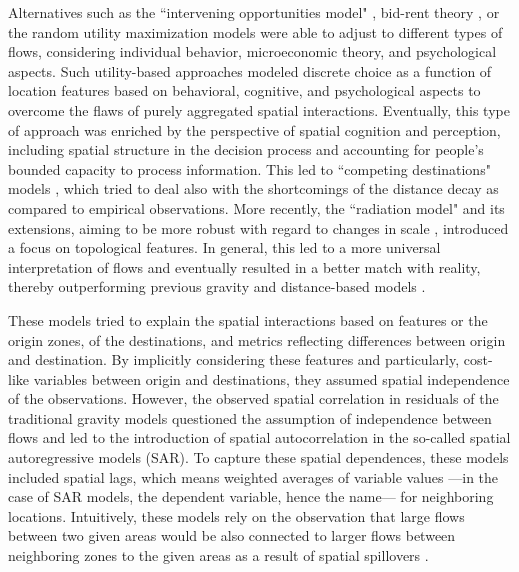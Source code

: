 Alternatives such as the ``intervening opportunities model" \citep{Stouffer1940InterveningDistance}, bid-rent theory \citep{Alonso1964LocationRent}, or the random utility maximization models \citep{Block1959RandomResponse} were able to adjust to different types of flows, considering individual behavior, microeconomic theory, and psychological aspects. Such utility-based approaches modeled discrete choice \citep{McFadden1974ConditionalBehavior, Ben-Akiva1985DiscreteDemand} as a function of location features based on behavioral, cognitive, and psychological aspects to overcome the flaws of purely aggregated spatial interactions. 
Eventually, this type of approach was enriched by the perspective of spatial cognition and perception, including spatial structure in the decision process and accounting for people's bounded capacity to process information. This led to ``competing destinations" models \citep{Fotheringham1983ADestinations}, which tried to deal also with the shortcomings of the distance decay as compared to empirical observations.
More recently, the ``radiation model" \citep{Simini2012APatterns} and its extensions, aiming to be more robust with regard to changes in scale \citep{Simini2013HumanApproach, Yang2014LimitsCalibration}, introduced a focus on topological features. In general, this led to a more universal interpretation of flows \citep{Masucci2013GravityFlows} and eventually resulted in a better match with reality, thereby outperforming previous gravity and distance-based models \citep{Noulas2012AMobility}.

These models tried to explain the spatial interactions based on features or the origin zones, of the destinations, and metrics reflecting differences between origin and destination. By implicitly considering these features and particularly, cost-like variables between origin and destinations, they assumed spatial independence of the observations. However, the observed spatial correlation in residuals of the traditional gravity models \citep{Moran1950NotesPhenomena.,Curry1972AFlows, Griffith1980ExplorationsInteraction.} questioned the assumption of independence between flows and led to the introduction of spatial autocorrelation in the so-called spatial autoregressive models (SAR). To capture these spatial dependences, these models included spatial lags, which means weighted averages of variable values ---in the case of SAR models, the dependent variable, hence the name--- for neighboring locations. Intuitively, these models rely on the observation that large flows between two given areas would be also connected to larger flows between neighboring zones to the given areas as a result of spatial spillovers \citep{LeSage2008SpatialFlows}.


